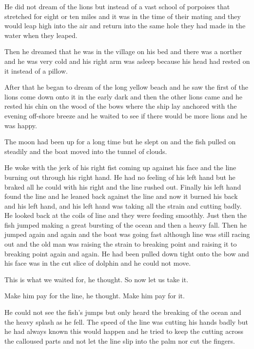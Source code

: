 He did not dream of the lions but instead of a \gls{vast} school of
porpoises that \gls{stretched} for eight or ten miles and it was in the time of
their \gls{mating} and they would leap high into the air and return into the same
hole they had made in the water when they leaped.

Then he dreamed that he was in the village on his bed and there was a
\gls{norther} and he was very cold and his right arm was asleep because his
head had rested on it instead of a pillow.

After that he began to dream of the long yellow beach and he saw the first
of the lions come down onto it in the early dark and then the other lions
came and he rested his chin on the wood of the bows where the ship lay
anchored with the evening off-shore breeze and he waited to see if there
would be more lions and he was happy.

The moon had been up for a long time but he slept on and the fish pulled on
steadily and the boat moved into the \gls{tunnel} of clouds.

He woke with the jerk of his right \gls{fist} coming up against his face and
the line burning out through his right hand. He had no feeling of his left
hand but he \gls{braked} all he could with his right and the line rushed
out. Finally his left hand found the line and he leaned back against the
line and now it burned his back and his left hand, and his left hand was
taking all the strain and cutting badly. He looked back at the coils of line
and they were feeding smoothly. Just then the fish jumped making a great
\gls{bursting} of the ocean and then a heavy fall. Then he jumped again and
again and the boat was going fast although line was still racing out and the
old man was raising the strain to breaking point and raising it to breaking
point again and again. He had been pulled down tight onto the bow and his
face was in the cut slice of dolphin and he could not move.

This is what we waited for, he thought. So now let us take it.

Make him pay for the line, he thought. Make him pay for it.

He could not see the fish's jumps but only heard the breaking of the ocean
and the heavy \gls{splash} as he fell. The speed of the line was cutting his
hands badly but he had always known this would happen and he tried to keep
the cutting across the \gls{calloused} parts and not let the line slip into
the \gls{palm} nor cut the fingers.

